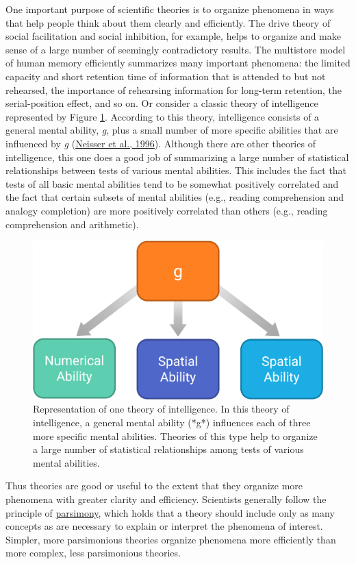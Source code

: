 \documentclass[
]{krantz}
\begin{document}
One important purpose of scientific theories is to organize phenomena in ways that help people think about them clearly and efficiently. The drive theory of social facilitation and social inhibition, for example, helps to organize and make sense of a large number of seemingly contradictory results. The multistore model of human memory efficiently summarizes many important phenomena: the limited capacity and short retention time of information that is attended to but not rehearsed, the importance of rehearsing information for long-term retention, the serial-position effect, and so on. Or consider a classic theory of intelligence represented by Figure \ref{fig:g}. According to this theory, intelligence consists of a general mental ability, \emph{g}, plus a small number of more specific abilities that are influenced by \emph{g} (\protect\hyperlink{ref-neisser1996intelligence}{Neisser et al., 1996}). Although there are other theories of intelligence, this one does a good job of summarizing a large number of statistical relationships between tests of various mental abilities. This includes the fact that tests of all basic mental abilities tend to be somewhat positively correlated and the fact that certain subsets of mental abilities (e.g., reading comprehension and analogy completion) are more positively correlated than others (e.g., reading comprehension and arithmetic).

\begin{figure}

{\centering \includegraphics[width=0.45\linewidth]{images/theory/g} 

}

\caption{Representation of one theory of intelligence. In this theory of intelligence, a general mental ability (*g*) influences each of three more specific mental abilities. Theories of this type help to organize a large number of statistical relationships among tests of various mental abilities.}\label{fig:g}
\end{figure}

Thus theories are good or useful to the extent that they organize more phenomena with greater clarity and efficiency. Scientists generally follow the principle of \protect\hyperlink{parsimony}{parsimony}, which holds that a theory should include only as many concepts as are necessary to explain or interpret the phenomena of interest. Simpler, more parsimonious theories organize phenomena more efficiently than more complex, less parsimonious theories.
\end{document}
